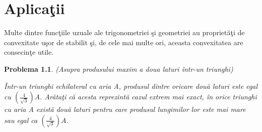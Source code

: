 \documentclass[a4paper,12pt,oneside]{report}
\newtheorem{problem}{Problema}
\begin{document}
%
%
%
%


\chapter{Aplica\c{t}ii}

Multe dintre func\c{t}iile uzuale ale trigonometriei \c{s}i geometriei au propriet\u{a}\c{t}i de convexitate u\c{s}or de stabilit \c{s}i, de cele mai multe ori, aceasta convexitatea are consecinţe utile.

\begin{problem}(Asupra produsului maxim a doua laturi \^{i}ntr-un triunghi)

\^{I}ntr-un triunghi echilateral cu aria A, produsul dintre oricare dou\u{a} laturi este egal cu \(\left (\frac{4}{\sqrt{3}}  \right )\)A. Ar\u{a}ta\c{t}i c\u{a} acesta reprezint\u{a} cazul extrem mai exact, \^{i}n orice triunghi cu aria A  exist\u{a} dou\u{a} laturi pentru care produsul lungimilor lor este mai mare sau egal ca \(\left (\frac{4}{\sqrt{3}}  \right )A\).
\end{problem}
\end{document}
